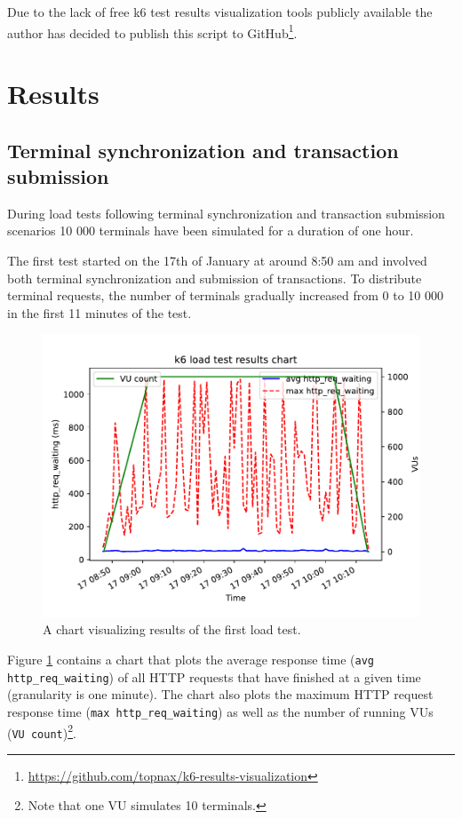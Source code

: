 \documentclass[12pt, a4paper]{article}
\let\oldsection\section
\renewcommand\section{\clearpage\oldsection}
\begin{document}
Due to the lack of free k6 test results visualization tools publicly available the author has decided to publish this script to GitHub\footnote{\url{https://github.com/topnax/k6-results-visualization}}.

\section{Results}

\subsection{Terminal synchronization and transaction submission}
During load tests following terminal synchronization and transaction submission scenarios 10 000 terminals have been simulated for a duration of one hour.

The first test started on the 17th of January at around 8:50 am and involved both terminal synchronization and submission of transactions.
To distribute terminal requests, the number of terminals gradually increased from 0 to 10 000 in the first 11 minutes of the test.

\begin{figure}[!ht]
    \centering 
    \includegraphics[width=1\textwidth]{pdf/avg-waiting-time-1.pdf}
    \caption{A chart visualizing results of the first load test.}
    \label{fig:waiting-time-1}
\end{figure}

Figure \ref{fig:waiting-time-1} contains a chart that plots the average response time (\texttt{avg http\_req\_waiting}) of all HTTP requests that have finished at a given time (granularity is one minute).
The chart also plots the maximum HTTP request response time (\texttt{max http\_req\_waiting}) as well as the number of running VUs (\texttt{VU count})\footnote{Note that one VU simulates 10 terminals.}.
\end{document}
